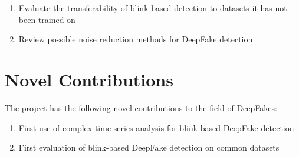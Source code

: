 \begin{enumerate}
    \item Evaluate the transferability of blink-based detection to datasets it has not been trained on
    \item Review possible noise reduction methods for DeepFake detection
\end{enumerate}

\section{Novel Contributions}

The project has the following novel contributions to the field of DeepFakes:

\begin{enumerate}
    \item First use of complex time series analysis for blink-based DeepFake detection
    \item First evaluation of blink-based DeepFake detection on common datasets
\end{enumerate}